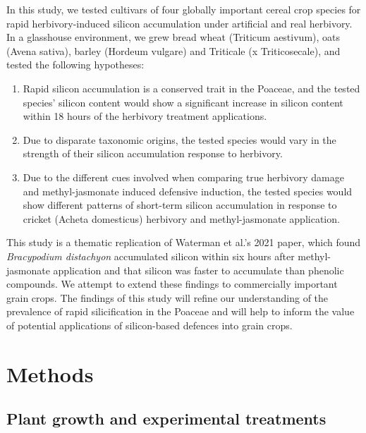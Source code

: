 \documentclass[12pt, letterpaper]{report}
\begin{document}
In this study, we tested cultivars of four globally important cereal crop species for rapid herbivory-induced silicon accumulation under artificial and real herbivory. In a glasshouse environment, we grew bread wheat (Triticum aestivum), oats (Avena sativa), barley (Hordeum vulgare) and Triticale (x Triticosecale), and tested the following hypotheses:
\begin{enumerate}
        \item Rapid silicon accumulation is a conserved trait in the Poaceae, and the tested species' silicon content would show a significant increase in silicon content within 18 hours of the herbivory treatment applications.
        \item Due to disparate taxonomic origins, the tested species would vary in the strength of their silicon accumulation response to herbivory. 
        \item Due to the different cues involved when comparing true herbivory damage and methyl-jasmonate induced defensive induction, the tested species would show different patterns of short-term silicon accumulation in response to cricket (Acheta domesticus) herbivory and methyl-jasmonate application. 
\end{enumerate}
This study is a thematic replication of Waterman et al.’s 2021 paper, which found \textit{Bracypodium distachyon} accumulated silicon within six hours after methyl-jasmonate application and that silicon was faster to accumulate than phenolic compounds. We attempt to extend these findings to commercially important grain crops. The findings of this study will refine our understanding of the prevalence of rapid silicification in the Poaceae and will help to inform the value of potential applications of silicon-based defences into grain crops.

\section{Methods}

\subsection{Plant growth and experimental treatments}
\end{document}
